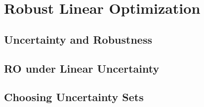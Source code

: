 \documentclass{bookest}
\begin{document}
%		
%	
%	
%	
%	
%	
	

	\part{Robust Linear Optimization}
	
	\chapter{Uncertainty and Robustness} \label{chapter_1}
	
	
	\chapter{RO under Linear Uncertainty} \label{chapter_2}
	
	
	\chapter{Choosing Uncertainty Sets} \label{chapter_3}
	
	
\end{document}
